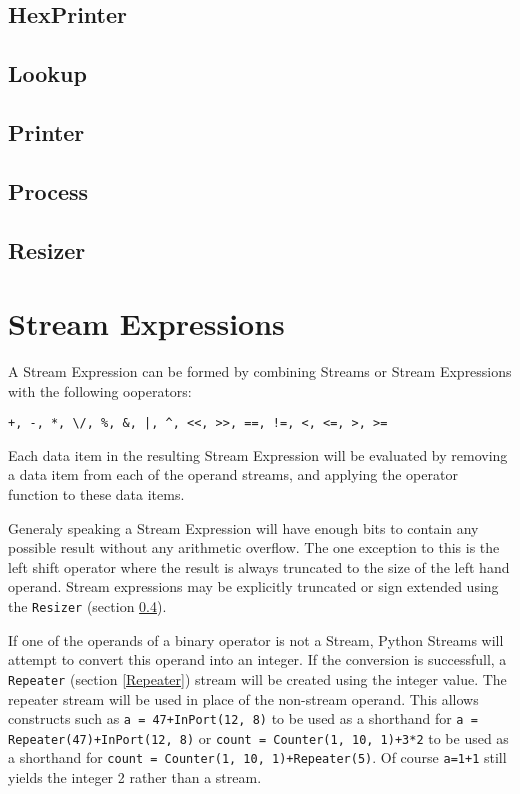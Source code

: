 \subsection{HexPrinter}
\subsection{Lookup}
\subsection{Printer}
\subsection{Process}
\label{Resizer}
\subsection{Resizer}

\section{Stream Expressions}

A Stream Expression can be formed by combining Streams or Stream Expressions
with the following ooperators: 
\begin{verbatim}
+, -, *, \/, %, &, |, ^, <<, >>, ==, !=, <, <=, >, >=
\end{verbatim}
Each data item in the resulting Stream Expression will be evaluated by removing
a data item from each of the operand streams, and applying the operator function
to these data items.

Generaly speaking a Stream Expression will have enough bits to contain any
possible result without any arithmetic overflow. The one exception to this is
the left shift operator where the result is always truncated to the size of the
left hand operand. Stream expressions may be explicitly truncated or sign
extended using the \verb|Resizer| (section \ref{Resizer}).

If one of the operands of a binary operator is not a Stream, Python Streams
will attempt to convert this operand into an integer. If the conversion is
successfull, a \verb|Repeater| (section \ref{Repeater}) stream will be created
using the integer value. The repeater stream will be used in place of the
non-stream operand. This allows constructs such as \verb|a = 47+InPort(12, 8)|
to be used as a shorthand for \verb|a = Repeater(47)+InPort(12, 8)| or
\verb|count = Counter(1, 10, 1)+3*2| to be used as a shorthand for
\verb|count = Counter(1, 10, 1)+Repeater(5)|.
Of course \verb|a=1+1| still yields the integer 2 rather than a stream.


